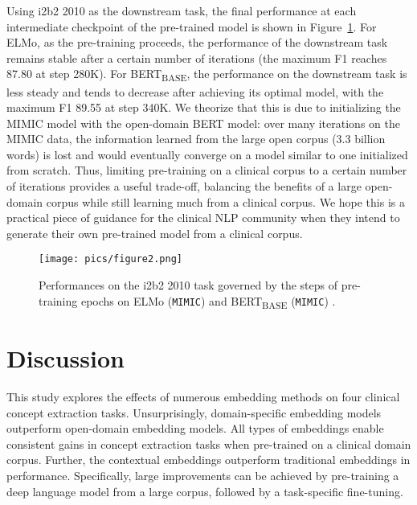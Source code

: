 \documentclass[11pt,a4paper]{article}
\begin{document}
Using i2b2 2010 as the downstream task, the final performance at each intermediate checkpoint of the pre-trained model is shown in Figure~\ref{figure:pretraining}. For ELMo, as the pre-training proceeds, the performance of the downstream task remains stable after a certain number of iterations (the maximum F1 reaches 87.80 at step 280K). For BERT\textsubscript{BASE}, the performance on the downstream task is less steady and tends to decrease after achieving its optimal model, with the maximum F1 89.55 at step 340K. We theorize that this is due to initializing the MIMIC model with the open-domain BERT model: over many iterations on the MIMIC data, the information learned from the large open corpus (3.3 billion words) is lost and would eventually converge on a model similar to one initialized from scratch. Thus, limiting pre-training on a clinical corpus to a certain number of iterations provides a useful trade-off, balancing the benefits of a large open-domain corpus while still learning much from a clinical corpus. We hope this is a practical piece of guidance for the clinical NLP community when they intend to generate their own pre-trained model from a clinical corpus.
\begin{figure}[h!]
\centering
\texttt{[image: pics/figure2.png]}
\caption{Performances on the i2b2 2010 task governed by the steps of pre-training epochs on ELMo (\texttt{MIMIC}) and BERT\textsubscript{BASE} (\texttt{MIMIC}) .}
\label{figure:pretraining}
\end{figure} 

\section{Discussion}

This study explores the effects of numerous embedding methods on four clinical concept extraction tasks. Unsurprisingly, domain-specific embedding models outperform open-domain embedding models. All types of embeddings enable consistent gains in concept extraction tasks when pre-trained on a clinical domain corpus. Further, the contextual embeddings outperform traditional embeddings in performance. Specifically, large improvements can be achieved by pre-training a deep language model from a large corpus, followed by a task-specific fine-tuning. 
\end{document}
